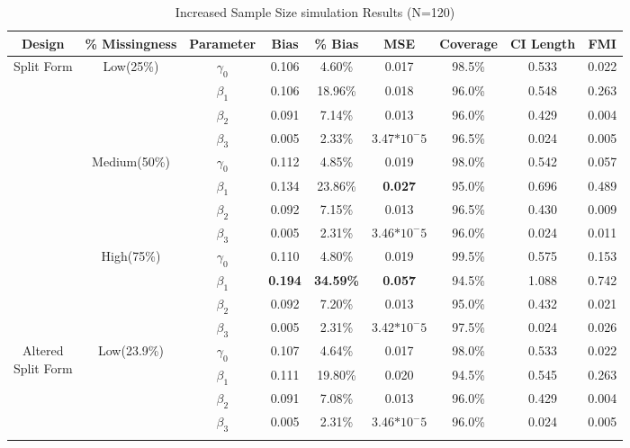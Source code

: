 \documentclass{svjour3}\usepackage[]{graphicx}\usepackage[]{color}
\begin{document}
\begin{table}[p]
	\centering
	\caption{Increased Sample Size simulation Results (N=120)}
	\setlength{\tabcolsep}{0.1cm}
	\label{tab:table4}
	\hspace*{-1cm}
	\begin{tabular}{c|c|c|cccccc}
		\toprule
		Design & \% Missingness & Parameter & Bias & \% Bias & MSE & Coverage & CI Length & FMI \\
		\midrule
		\multirow{12}{*}{Split Form}
		& \multirow{4}{*}{Low(25\%)}
		& $\gamma_0$ & 0.106 & 4.60\% & 0.017 & 98.5\% & 0.533 & 0.022 \\
		&& $\beta_1$ & 0.106 & 18.96\% & 0.018 & 96.0\% & 0.548 & 0.263 \\
		&& $\beta_2$ & 0.091 & 7.14\% & 0.013 & 96.0\% & 0.429 & 0.004 \\
		&& $\beta_3$ & 0.005 & 2.33\% & 3.47$*10^-5$ & 96.5\% & 0.024 & 0.005 \\ \cline{2-9} \noalign{\smallskip}
		&\multirow{4}{*}{Medium(50\%)}
		& $\gamma_0$ & 0.112 & 4.85\% & 0.019 & 98.0\% & 0.542 & 0.057 \\
		&& $\beta_1$ & 0.134 & 23.86\% & \textbf{0.027} & 95.0\% & 0.696 & 0.489 \\
		&& $\beta_2$ & 0.092 & 7.15\% & 0.013 & 96.5\% & 0.430 & 0.009 \\
		&& $\beta_3$ & 0.005 & 2.31\% & 3.46$*10^-5$ & 96.0\% & 0.024 & 0.011 \\ \cline{2-9} \noalign{\smallskip}
		& \multirow{4}{*}{High(75\%)}
		& $\gamma_0$ & 0.110 & 4.80\% & 0.019 & 99.5\% & 0.575 & 0.153 \\
		&& $\beta_1$ & \textbf{0.194} & \textbf{34.59\%} & \textbf{0.057} & 94.5\% & 1.088 & 0.742 \\
		&& $\beta_2$ & 0.092 & 7.20\% & 0.013 & 95.0\% & 0.432 & 0.021 \\
		&& $\beta_3$ & 0.005 & 2.31\% & 3.42$*10^-5$ & 97.5\% & 0.024 & 0.026 \\
		\midrule
		\midrule
		\multirow{12}{*}{\parbox{1.75cm}{Altered \\ Split Form}}
		& \multirow{4}{*}{Low(23.9\%)}
		& $\gamma_0$ & 0.107 & 4.64\% & 0.017 & 98.0\% & 0.533 & 0.022 \\
		&& $\beta_1$ & 0.111 & 19.80\% & 0.020 & 94.5\% & 0.545 & 0.263 \\
		&& $\beta_2$ & 0.091 & 7.08\% & 0.013 & 96.0\% & 0.429 & 0.004 \\
		&& $\beta_3$ & 0.005 & 2.31\% & 3.46$*10^-5$ & 96.0\% & 0.024 & 0.005 \\ \cline{2-9} \noalign{\smallskip}

\end{tabular}
\end{table}
\end{document}
